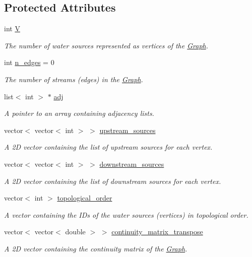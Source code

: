 \subsection*{Protected Attributes}
\begin{DoxyCompactItemize}
\item 
int \mbox{\hyperlink{classGraph_a2b722f7cfa7a21e4cb5fae488b3d4dcc}{V}}
\begin{DoxyCompactList}\small\item\em The number of water sources represented as vertices of the \mbox{\hyperlink{classGraph}{Graph}}. \end{DoxyCompactList}\item 
int \mbox{\hyperlink{classGraph_a9a7e34b482b020fa136fc8e0fa2d0030}{n\+\_\+edges}} = 0
\begin{DoxyCompactList}\small\item\em The number of streams (edges) in the \mbox{\hyperlink{classGraph}{Graph}}. \end{DoxyCompactList}\item 
list$<$ int $>$ $\ast$ \mbox{\hyperlink{classGraph_a04ab9c17ad31aa036def8db0f88b035b}{adj}}
\begin{DoxyCompactList}\small\item\em A pointer to an array containing adjacency lists. \end{DoxyCompactList}\item 
vector$<$ vector$<$ int $>$ $>$ \mbox{\hyperlink{classGraph_a2b9dc8c44ac87d67b061af1bf8dab2fa}{upstream\+\_\+sources}}
\begin{DoxyCompactList}\small\item\em A 2D vector containing the list of upstream sources for each vertex. \end{DoxyCompactList}\item 
vector$<$ vector$<$ int $>$ $>$ \mbox{\hyperlink{classGraph_a1c89a48555f165ef3e80b85ca5655bea}{downstream\+\_\+sources}}
\begin{DoxyCompactList}\small\item\em A 2D vector containing the list of downstream sources for each vertex. \end{DoxyCompactList}\item 
vector$<$ int $>$ \mbox{\hyperlink{classGraph_ad18af6207537a43b3cf53b56acaf92fd}{topological\+\_\+order}}
\begin{DoxyCompactList}\small\item\em A vector containing the I\+Ds of the water sources (vertices) in topological order. \end{DoxyCompactList}\item 
vector$<$ vector$<$ double $>$ $>$ \mbox{\hyperlink{classGraph_af903899bcb412f62ec4aa295eef9f45c}{continuity\+\_\+matrix\+\_\+transpose}}
\begin{DoxyCompactList}\small\item\em A 2D vector containing the continuity matrix of the \mbox{\hyperlink{classGraph}{Graph}}. \end{DoxyCompactList}\end{DoxyCompactItemize}


